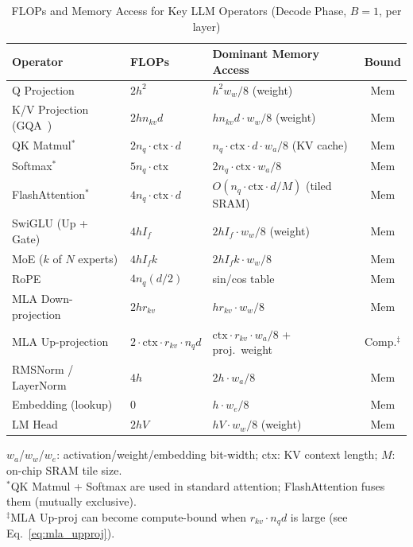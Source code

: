 \documentclass[journal]{IEEEtran}
\begin{document}
\begin{table}[t]
\centering
\caption{FLOPs and Memory Access for Key LLM Operators (Decode Phase, $B{=}1$, per layer)}
\label{tab:operators}
\renewcommand{\arraystretch}{1.12}
\small
\setlength{\tabcolsep}{5pt}
\begin{tabular}{@{}lllc@{}}
\toprule
\textbf{Operator} & \textbf{FLOPs} & \textbf{Dominant Memory Access} & \textbf{Bound} \\
\midrule
Q Projection             & $2h^2$                         & $h^2 w_w/8$ (weight)                 & Mem \\
K/V Projection (GQA~\cite{gqa}) & $2h n_{kv} d$           & $h n_{kv} d \cdot w_w/8$ (weight)    & Mem \\
QK Matmul$^*$            & $2 n_q \cdot \text{ctx} \cdot d$   & $n_q \cdot \text{ctx} \cdot d \cdot w_a/8$ (KV cache) & Mem \\
Softmax$^*$              & $5 n_q \cdot \text{ctx}$       & $2 n_q \cdot \text{ctx} \cdot w_a/8$ & Mem \\
FlashAttention$^*$~\cite{flashattn2} & $4 n_q \cdot \text{ctx} \cdot d$ & $O(n_q \cdot \text{ctx} \cdot d / M)$ (tiled SRAM) & Mem \\
SwiGLU (Up + Gate)       & $4 h I_f$                      & $2 h I_f \cdot w_w/8$ (weight)       & Mem \\
MoE ($k$ of $N$ experts) & $4 h I_f k$                    & $2 h I_f k \cdot w_w/8$              & Mem \\
RoPE                     & $4 n_q (d/2)$                  & sin/cos table                        & Mem \\
MLA Down-projection      & $2 h r_{kv}$                   & $h r_{kv} \cdot w_w/8$               & Mem \\
MLA Up-projection        & $2 \cdot \text{ctx} \cdot r_{kv} \cdot n_q d$ & $\text{ctx} \cdot r_{kv} \cdot w_a/8$ + proj.\ weight & Comp.$^\ddagger$ \\
RMSNorm / LayerNorm      & $4h$                           & $2h \cdot w_a/8$                     & Mem \\
Embedding (lookup)       & 0                              & $h \cdot w_e/8$                      & Mem \\
LM Head                  & $2hV$                          & $hV \cdot w_w/8$ (weight)            & Mem \\
\bottomrule
\end{tabular}

\vspace{1pt}
{\footnotesize
$w_a$/$w_w$/$w_e$: activation/weight/embedding bit-width; ctx: KV context length; $M$: on-chip SRAM tile size.\\
$^*$QK Matmul + Softmax are used in standard attention; FlashAttention fuses them (mutually exclusive).\\
$^\ddagger$MLA Up-proj can become compute-bound when $r_{kv} \cdot n_q d$ is large (see Eq.~\ref{eq:mla_upproj}).
}
\end{table}
\end{document}
